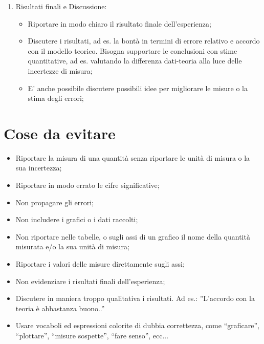 \documentclass{lab1-article}
\begin{document}
\begin{article}
\begin{enumerate}[label={\alph*)}]
\begin{itemize}
\end{itemize}
\item Risultati finali e Discussione:
\begin{itemize}
 \item Riportare in modo chiaro il risultato finale dell'esperienza;
 \item Discutere i risultati, ad es. la bont\`a in termini di errore relativo e accordo con il modello teorico.
Bisogna supportare le conclusioni con stime quantitative, ad
es. valutando la differenza dati-teoria alla luce delle incertezze di misura;
 \item E' anche possibile discutere possibili idee per migliorare le misure o la stima degli errori;
\end{itemize}
\end{enumerate}
\section{Cose da evitare}
\begin{itemize}
 \item Riportare la misura di una quantit\`a senza riportare le unit\`a di misura o la sua incertezza;
 \item Riportare in modo errato le cifre significative;
 \item Non propagare gli errori;
 \item Non includere i grafici o i dati raccolti;
 \item Non riportare nelle tabelle, o sugli assi di un grafico il nome della quantit\`a misurata e/o la sua unit\`a di misura;
 \item Riportare i valori delle misure direttamente sugli assi;
 \item Non evidenziare i risultati finali dell'esperienza;
 \item Discutere in maniera troppo qualitativa i risultati. Ad es.: ''L'accordo con la teoria \`e abbastanza buono..''
 \item Usare vocaboli ed espressioni colorite di dubbia correttezza, come ``graficare'', ``plottare'', ``misure sospette'',
``fare senso'', ecc...
\end{itemize}

\end{article}
\end{document}
